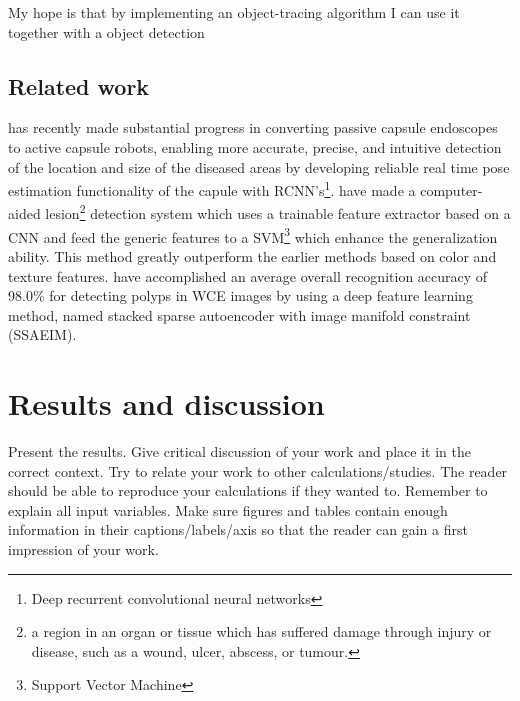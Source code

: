 \documentclass[english, a4paper]{report}
\begin{document}
My hope is that by implementing an object-tracing algorithm I can use it together with a object detection 


\subsection{Related work}
\citeauthor*{DeepEndoVO18} \cite{DeepEndoVO18} has recently made substantial progress in converting passive capsule endoscopes to active capsule robots, enabling more accurate, precise, and intuitive detection of the location and size of the diseased areas by developing reliable real time pose estimation functionality of the capule with RCNN's\footnote{Deep recurrent convolutional neural networks}. \citeauthor*{LesionDetection15} \cite{LesionDetection15} have made a computer-aided lesion\footnote{a region in an organ or tissue which has suffered damage through injury or disease, such as a wound, ulcer, abscess, or tumour.} detection system which uses a trainable feature extractor based on a CNN and feed the generic features to a SVM\footnote{Support Vector Machine} which enhance the generalization ability. This method greatly outperform the earlier methods based on color and texture features. \citeauthor*{DeepLearning17a} \cite{DeepLearning17a} have accomplished an average overall recognition accuracy of 98.0\% for detecting polyps in WCE images by using a deep feature learning method, named stacked sparse autoencoder with image manifold constraint (SSAEIM).


\section{Results and discussion}
Present the results. Give critical discussion of your work and place it in the correct context. Try to relate your work to other calculations/studies. The reader should be able to reproduce your calculations if they wanted to. Remember to explain all input variables. Make sure figures and tables contain enough information in their captions/labels/axis so that the reader can gain a first impression of your work.





\newpage
\printbibliography
\end{document}
